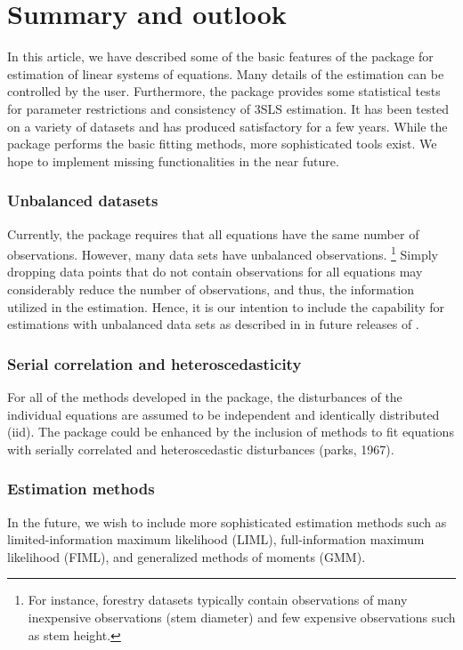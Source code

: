 

\section{Summary and outlook}\label{sec:Summmary}
\nopagebreak
In this article, we have described some of the basic features of the
 package for estimation of linear systems of
equations.
Many details of the estimation can be controlled by the user.
Furthermore, the package provides some statistical tests
for parameter restrictions and consistency of 3SLS estimation.
It has been tested on a variety of datasets and has produced satisfactory
for a few years.
While the  package performs the basic fitting methods,
more sophisticated tools exist.
We hope to implement missing functionalities
in the near future.

\subsubsection*{Unbalanced datasets}
Currently, the  package requires
that all equations have the same number of observations.
However, many data sets have unbalanced observations.%
\footnote{
For instance,
forestry datasets typically contain observations of many inexpensive
observations (stem diameter) and few expensive observations such
as stem height.
}
Simply dropping data points
that do not contain observations for all equations
may considerably reduce the number of observations,
and thus, the information utilized in the estimation.
Hence, it is our intention to include the capability for estimations
with unbalanced data sets as described in \citet{schmidt77}
in future releases of .

\subsubsection*{Serial correlation and heteroscedasticity}
For all of the methods developed in the package, the disturbances of
the individual equations are assumed to be independent and identically
distributed (iid).
The package could be enhanced by the inclusion of methods to fit
equations with serially correlated and heteroscedastic disturbances
(parks, 1967). 

\subsubsection*{Estimation methods}
In the future, we wish to include more sophisticated estimation
methods such as limited-information maximum likelihood (LIML),
full-information maximum likelihood (FIML), and generalized methods of
moments (GMM).

